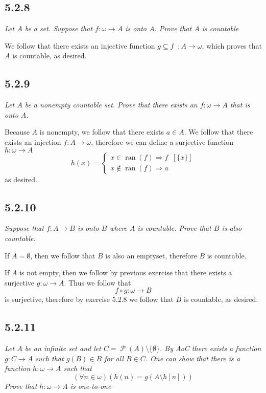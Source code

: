 \documentclass[11pt,oneside,titlepage]{book}
\DeclareMathOperator \pow {\mathcal {P}}
\DeclareMathOperator \inv {^{-1}}
\DeclareMathOperator \ra {\Rightarrow}
\DeclareMathOperator \ran {ran}
\begin{document}
\subsection*{5.2.8}

\textit{Let $A$ be a set. Suppose that $f: \omega \to A$ is onto $A$. Prove that $A$ is
  countable}

We follow that there exists an injective function  $g \subseteq f\inv: A \to \omega$,
which proves that $A$ is countable, as desired.

\subsection*{5.2.9}

\textit{Let $A$ be a nonempty countable set. Prove that there exists an $f: \omega \to A$
  that is onto $A$.}

Because $A$ is nonempty, we follow that there exists $a \in A$. 
We follow that there exists an injection $f: A \to \omega$, therefore we can define a
surjective function $h: \omega \to A$
$$h(x) =
\begin{cases}
  x \in \ran(f) \ra f\inv[\{x\}] \\
  x \notin \ran(f) \ra a 
\end{cases}
$$
as desired.

\subsection*{5.2.10}

\textit{Suppose that $f: A \to B$ is onto $B$ where $A$ is countable. Prove that $B$ is
  also countable.}

If $A = \emptyset$, then we follow that $B$ is also an emptyset, therefore $B$ is countable.

If $A$ is not empty, then we follow by previous exercise that there exists a surjective
$g: \omega \to A$. Thus we follow that
$$f \circ g: \omega \to B$$
is surjective, therefore by exercise 5.2.8 we follow that $B$ is countable, as desired.


\subsection*{5.2.11}

\textit{Let $A$ be an infinite set and let $C = \pow(A) \setminus \{\emptyset\}$.
  By AoC there exists a function $g: C \to A$ such that $g(B) \in B$ for all $B \in C$.
  One can show that there is a function $h: \omega \to A$ such that
  $$(\forall n \in \omega )(h(n) = g(A \setminus h[n]))$$
  Prove that $h: \omega \to A$ is one-to-one}
\end{document}
